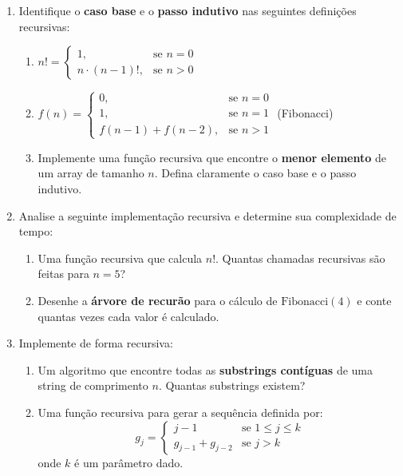 \documentclass[a4paper,11pt]{report}
\begin{document}
\begin{enumerate}

\item Identifique o \textbf{caso base} e o \textbf{passo indutivo} nas seguintes definições recursivas:

\begin{enumerate}
 \item[a)] $n! = \begin{cases} 1, & \text{se } n = 0 \\ n \cdot (n-1)!, & \text{se } n > 0 \end{cases}$
 
 \item[b)] $f(n) = \begin{cases} 0, & \text{se } n = 0 \\ 1, & \text{se } n = 1 \\ f(n-1) + f(n-2), & \text{se } n > 1 \end{cases}$ (Fibonacci)
 
 \item[c)] Implemente uma função recursiva que encontre o \textbf{menor elemento} de um array de tamanho $n$. Defina claramente o caso base e o passo indutivo.
\end{enumerate}

\item Analise a seguinte implementação recursiva e determine sua complexidade de tempo:
\begin{enumerate}
 \item[a)] Uma função recursiva que calcula $n!$. Quantas chamadas recursivas são feitas para $n = 5$?
 
 \item[b)] Desenhe a \textbf{árvore de recurão} para o cálculo de $\text{Fibonacci}(4)$ e conte quantas vezes cada valor é calculado.
 \end{enumerate}

\item Implemente de forma recursiva:

\begin{enumerate}
 \item[a)] Um algoritmo que encontre todas as \textbf{substrings contíguas} de uma string de comprimento $n$. Quantas substrings existem?
 
 \item[b)] Uma função recursiva para gerar a sequência definida por:
  $$g_j = \begin{cases} j-1 & \text{se } 1 \leq j \leq k \\ g_{j-1} + g_{j-2} & \text{se } j > k \end{cases}$$
  onde $k$ é um parâmetro dado.
\end{enumerate}


\end{enumerate}
\end{document}
